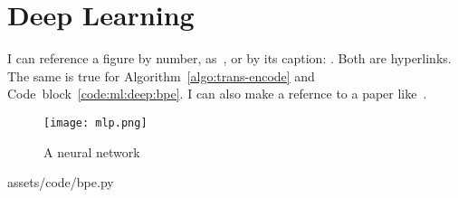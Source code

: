 \section{Deep Learning}\label{sec:ml:deep}

I can reference a figure by number, as~,
or by its caption: .
Both are hyperlinks.
The same is true for Algorithm~\ref{algo:trans-encode} and Code~block~\ref{code:ml:deep:bpe}.
I can also make a refernce to a paper like~\cite{attention}.
\begin{figure}[hbt]
    \begin{center}
        \texttt{[image: mlp.png]}
    \end{center}
    \caption{A neural network}%
    \label{fig:ml:deep:neuralnet}
\end{figure}
%
{assets/code/bpe.py}
